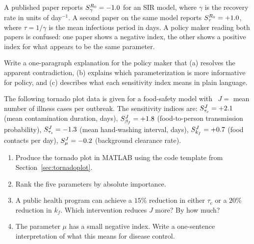 \begin{exercise}[\bloom{L4}]
\label{ex:ch2:reparamjudge}
A published paper reports $S_{\gamma}^{R_0} = -1.0$ for an SIR model,
where $\gamma$ is the recovery rate in units of day$^{-1}$.
A second paper on the same model reports $S_{\tau}^{R_0} = +1.0$,
where $\tau = 1/\gamma$ is the mean infectious period in days.
A policy maker reading both papers is confused: one paper shows a
negative index, the other shows a positive index for what appears to
be the same parameter.

Write a one-paragraph explanation for the policy maker that
(a) resolves the apparent contradiction,
(b) explains which parameterization is more informative for policy,
and (c) describes what each sensitivity index means in plain language.
\end{exercise}

\begin{exercise}[\bloom{L4}]
\label{ex:ch2:tornado_interp}
The following tornado plot data is given for a food-safety model with
\QOI~$J =$ mean number of illness cases per outbreak. The sensitivity
indices are:
$S_{\tau_c}^{J} = +2.1$ (mean contamination duration, days),
$S_{\beta_f}^{J} = +1.8$ (food-to-person transmission probability),
$S_{\tau_s}^{J} = -1.3$ (mean hand-washing interval, days),
$S_{k_f}^{J} = +0.7$ (food contacts per day),
$S_{\mu}^{J} = -0.2$ (background clearance rate).
\begin{enumerate}[label=(\alph*)]
  \item Produce the tornado plot in MATLAB using the code template
        from Section~\ref{sec:tornadoplot}.
  \item Rank the five parameters by absolute importance.
  \item A public health program can achieve a $15\%$ reduction in either
        $\tau_c$ or a $20\%$ reduction in $k_f$. Which intervention
        reduces $J$ more? By how much?
  \item The parameter $\mu$ has a small negative index. Write a
        one-sentence interpretation of what this means for disease control.
\end{enumerate}
\end{exercise}

